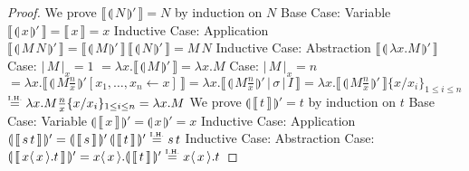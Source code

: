 \documentclass[a4paper,UKenglish,cleveref, autoref]{lipics-v2019}
\newcommand{\abs}[2]{\lambda #1 . #2}
\newcommand{\app}[2]{#1 \, #2}
\newcommand{\fake}[3]{#1 \langle \, #2 \, \rangle . #3}
\newcommand{\share}[3]{#1 [#2 \leftarrow #3]}
\newcommand{\size}[1]{\vert \, #1 \, \vert}
\newcommand{\sub}[3]{#1 \{ #2 / #3 \}}
\newcommand{\compile}[1]{\llparenthesis \, #1 \, \rrparenthesis}
\newcommand{\readbackclose}[1]{\llbracket \, #1 \, \rrbracket }
\newcommand{\readbackwmap}[3]{\llbracket \, #1 \, \vert \, #2 \, \vert \, #3  \, \rrbracket }
\newcommand{\IH}{\stackrel{\hbox{\tiny I.H.}}{\hbox{=}}}
\begin{document}
\begin{proof}
We prove $\readbackclose{\compile{N}'} = N $ by induction on $N$
\newline
\newline
Base Case: Variable
\newline
$\readbackclose{\compile{x}'} = \readbackclose{x} = x$
\newline
\newline
Inductive Case: Application
\newline
$\readbackclose{\compile{\app{M}{N}}'} = \app{\readbackclose{\compile{M}'}}{\readbackclose{\compile{N}'}} = \app{M}{N}$
\newline
\newline
Inductive Case: Abstraction
\newline
$\readbackclose{\compile{\abs{x}{M}}'} $
\newline
\indent Case: $\size{M}_{x} = 1$
\newline
\indent $= \abs{x}{\readbackclose{\compile{M}'}} = \abs{x}{M}$
\newline
\newline
\indent Case: $\size{M}_{x} = n$
\newline
\indent $= \abs{x}{\readbackclose{ \compile{M \frac{n}{x}}' \share{}{x_{1}, \dots, x_{n}}{x}}} = \abs{x}{\readbackwmap{\compile{M \frac{n}{x}}'}{\sigma}{I}} = \abs{x}{\readbackclose{\compile{M \frac{n}{x}}'}} \sub{}{x}{x_{i}}_{1 \leq i \leq n}$
\newline
\indent $\IH \abs{x}{M \frac{n}{x} \sub{}{x}{x_{i}}_{1 \leq i \leq n}} = \abs{x}{M}$
\newline
\newline
\newline
We prove $ \compile{\readbackclose{t}}' = t$ by induction on $t$
\newline
\newline
Base Case: Variable
\newline
$\compile{\readbackclose{x}}' = \compile{x}' = x$
\newline
\newline
Inductive Case: Application
\newline
$\compile{\readbackclose{\app{s}{t}}}' = \app{\compile{\readbackclose{s}}'}{\compile{\readbackclose{t}}'} \IH \app{s}{t}$
\newline
\newline
Inductive Case: Abstraction
\newline
\indent Case: $\compile{\readbackclose{\fake{x}{x}{t}}}' = \fake{x}{x}{\compile{\readbackclose{t}}'} \IH \fake{x}{x}{t}$

\end{proof}
\end{document}
